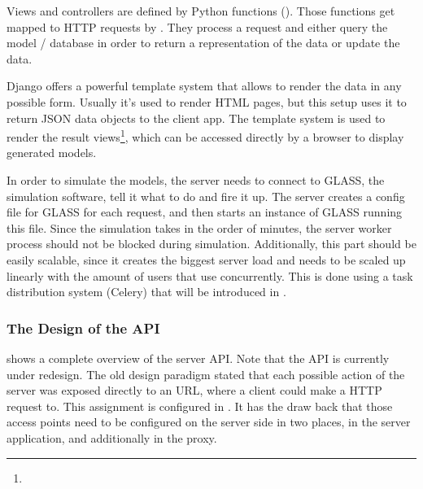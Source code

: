 Views and controllers are defined by Python functions ().
Those functions get mapped to HTTP requests by .
They process a request and either query the model / database in order to return a representation of the data or update the data.



Django offers a powerful template system that allows to render the data in any possible form.
Usually it's used to render HTML pages, but this setup uses it to return JSON data objects to the client app.
The template system is used to render the result views\footnote{}, which can be accessed directly by a browser to display generated models.

In order to simulate the models, the server needs to connect to GLASS, the simulation software, tell it what to do and fire it up.
The server creates a config file for GLASS for each request, and then starts an instance of GLASS running this file.
Since the simulation takes in the order of minutes, the server worker process should not be blocked during simulation.
Additionally, this part should be easily scalable, since it creates the biggest server load and needs to be scaled up linearly with the amount of users that use \spl concurrently.
This is done using a task distribution system (Celery) that will be introduced in .







\subsubsection{The Design of the API}





 shows a complete overview of the server API.
Note that the API is currently under redesign.
The old design paradigm stated that each possible action of the server was exposed directly to an URL, where a client could make a HTTP request to. This assignment is configured in .
It has the draw back that those access points need to be configured on the server side in two places, in the server application, and additionally in the proxy.


